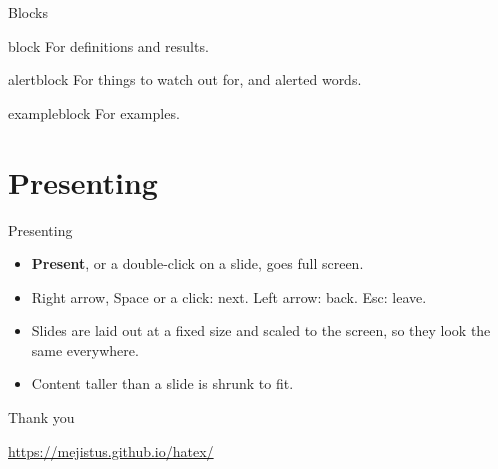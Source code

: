 \documentclass[aspectratio=169]{beamer}
\begin{document}
\begin{frame}{Blocks}
  \begin{block}{block}
    For definitions and results.
  \end{block}
  \begin{alertblock}{alertblock}
    For things to watch out for, and \alert{alerted} words.
  \end{alertblock}
  \begin{exampleblock}{exampleblock}
    For examples.
  \end{exampleblock}
\end{frame}

\section{Presenting}
\begin{frame}{Presenting}
  \begin{itemize}
    \item \textbf{Present}, or a double-click on a slide, goes full screen.
    \item Right arrow, Space or a click: next. Left arrow: back. Esc: leave.
    \item Slides are laid out at a fixed size and scaled to the screen, so they look the same everywhere.
    \item Content taller than a slide is shrunk to fit.
  \end{itemize}
\end{frame}

\begin{frame}[plain]
  \begin{center}
    {\Huge Thank you}

    \url{https://mejistus.github.io/hatex/}
  \end{center}
\end{frame}
\end{document}
